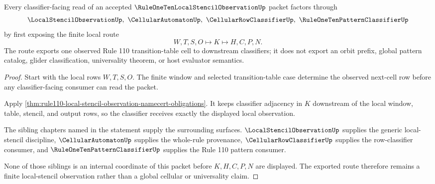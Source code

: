 \begin{theorem}
\label{thm:rule110-local-stencil-observation-classifier-route}
Every classifier-facing read of an accepted $\RuleOneTenLocalStencilObservationUp$ packet factors through
$$
\LocalStencilObservationUp,\ \CellularAutomatonUp,\ \CellularRowClassifierUp,\ \RuleOneTenPatternClassifierUp
$$
by first exposing the finite local route
$$
W,T,S,O \longmapsto K \longmapsto H,C,P,N .
$$
The route exports one observed Rule 110 transition-table cell to downstream classifiers; it does not export an orbit prefix, global pattern catalog, glider classification, universality theorem, or host evaluator semantics.
\end{theorem}
\begin{proof}
Start with the local rows $W,T,S,O$. The finite window and selected transition-table case determine the observed next-cell row before any classifier-facing consumer can read the packet.

Apply \autoref{thm:rule110-local-stencil-observation-namecert-obligations}. It keeps classifier adjacency in $K$ downstream of the local window, table, stencil, and output rows, so the classifier receives exactly the displayed local observation.

The sibling chapters named in the statement supply the surrounding surfaces. $\LocalStencilObservationUp$ supplies the generic local-stencil discipline, $\CellularAutomatonUp$ supplies the whole-rule provenance, $\CellularRowClassifierUp$ supplies the row-classifier consumer, and $\RuleOneTenPatternClassifierUp$ supplies the Rule 110 pattern consumer.

None of those siblings is an internal coordinate of this packet before $K,H,C,P,N$ are displayed. The exported route therefore remains a finite local-stencil observation rather than a global cellular or universality claim.
\end{proof}

